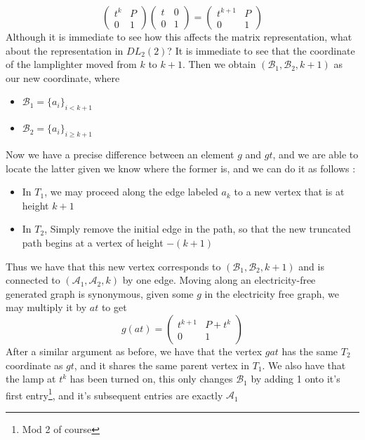 \[\begin{pmatrix}
    t^k & P\\
    0 & 1
\end{pmatrix}
\begin{pmatrix}
    t & 0\\
    0 & 1
\end{pmatrix} = \begin{pmatrix}
    t^{k+1} & P\\
    0 & 1
\end{pmatrix}\]
Although it is immediate to see how this affects the matrix representation, what about the representation in $DL_2(2)$? It is immediate to see that the coordinate of the lamplighter moved from $k$ to $k+1$. Then we obtain $(\mathcal{B}_1,\mathcal{B}_2, k+1)$ as our new coordinate, where
\begin{itemize}
    \item $\mathcal{B}_1= \{a_i\}_{i<k+1}$
    \item $\mathcal{B}_2= \{a_i\}_{i\geq k+1}$
\end{itemize}
Now we have a precise difference between an element $g$ and $gt$, and we are able to locate the latter given we know where the former is, and we can do it as follows :
\begin{itemize}
    \item In $T_1$, we may proceed along the edge labeled $a_k$ to a new vertex that is at height $k+1$
    \item In $T_2$, Simply remove the initial edge in the path, so that the new truncated path begins at a vertex of height $-(k+1)$
\end{itemize}
Thus we have that this new vertex corresponds to $(\mathcal{B}_1,\mathcal{B}_2, k+1)$ and is connected to $(\mathcal{A}_1,\mathcal{A}_2, k)$ by one edge. Moving along an electricity-free generated graph is synonymous, given some $g$ in the electricity free graph, we may multiply it by $at$ to get
\[g(at) = \begin{pmatrix}
    t^{k+1} & P+t^k\\
    0 & 1
\end{pmatrix}\]
After a similar argument as before, we have that the vertex $gat$ has the same $T_2$ coordinate as $gt$, and it shares the same parent vertex in $T_1$. We also have that the lamp at $t^k$ has been turned on, this only changes $\mathcal{B}_1$ by adding 1 onto it's first entry\footnote{Mod 2 of course}, and it's subsequent entries are exactly $\mathcal{A}_1$

\newpage
